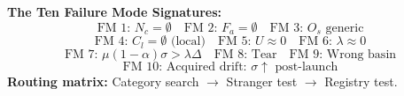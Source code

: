 \documentclass[12pt, openany]{book}
\theoremstyle{thmstyle}
\theoremstyle{defstyle}
\begin{document}
\begin{equationbox}
\textbf{The Ten Failure Mode Signatures:}
\[
\text{FM 1: } N_c = \emptyset \quad \text{FM 2: } F_a = \emptyset \quad \text{FM 3: } O_s \text{ generic}
\]
\[
\text{FM 4: } C_l = \emptyset \text{ (local)} \quad \text{FM 5: } U \approx 0 \quad \text{FM 6: } \lambda \approx 0
\]
\[
\text{FM 7: } \mu(1-\alpha)\sigma > \lambda\Delta \quad \text{FM 8: Tear} \quad \text{FM 9: Wrong basin}
\]
\[
\text{FM 10: Acquired drift: } \sigma \uparrow \text{ post-launch}
\]
\textbf{Routing matrix:} Category search $\to$ Stranger test $\to$ Registry test.
\end{equationbox}
\end{document}
